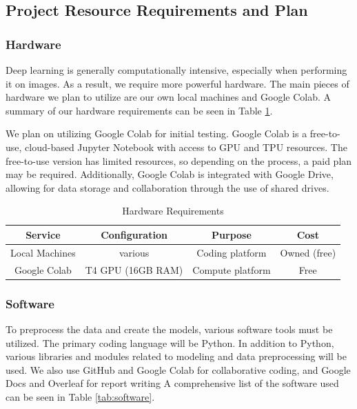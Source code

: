 \documentclass[stu,12pt,floatsintext]{apa7}
\begin{document}
\subsection{Project Resource Requirements and Plan}
\subsubsection{Hardware}
Deep learning is generally computationally intensive, especially when performing it on images. As a result, we require more powerful hardware. The main pieces of hardware we plan to utilize are our own local machines and Google Colab. A summary of our hardware requirements can be seen in Table \ref{tab:hardware}.

We plan on utilizing Google Colab for initial testing. Google Colab is a free-to-use, cloud-based Jupyter Notebook with access to GPU and TPU resources. The free-to-use version has limited resources, so depending on the process, a paid plan may be required. Additionally, Google Colab is integrated with Google Drive, allowing for data storage and collaboration through the use of shared drives.

\begin{table}[!htb]
    \centering
    \caption{Hardware Requirements}
    \begin{tabular}{cccc}
    \hline
         Service& Configuration & Purpose & Cost \\ 
         \hline
         Local Machines & various & Coding platform & Owned (free)\\
         Google Colab & T4 GPU (16GB RAM) & Compute platform & Free \\
         \hline
    \end{tabular}
    \label{tab:hardware}
\end{table}

\subsubsection{Software}
To preprocess the data and create the models, various software tools must be utilized. The primary coding language will be Python. In addition to Python, various libraries and modules related to modeling and data preprocessing will be used. We also use GitHub and Google Colab for collaborative coding, and Google Docs and Overleaf for report writing A comprehensive list of the software used can be seen in Table \ref{tab:software}.
\end{document}
